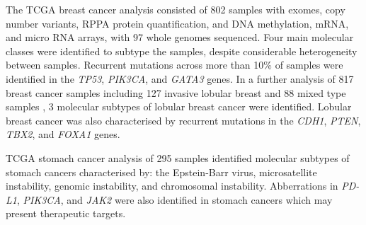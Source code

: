 The \gls{TCGA} breast cancer analysis \citep{TCGA2012} consisted of 802 samples with exomes, copy number variants, RPPA protein quantification, and \acrshort{DNA} methylation, \acrshort{mRNA}, and micro RNA arrays, with 97 whole \glspl{genome} sequenced. Four main molecular classes were identified to subtype the samples, despite considerable heterogeneity between samples. Recurrent \glspl{mutation} across more than 10\% of samples were identified in the \textit{TP53}, \textit{PIK3CA}, and \textit{GATA3} genes. %
In a further analysis of 817 breast cancer samples including 127 invasive lobular breast and 88 mixed type samples \citep{TCGA2015LBC}, 3 \glspl{molecular subtype} of lobular breast cancer were identified. Lobular breast cancer was also characterised by \glspl{recurrent mutation} in the \textit{CDH1}, \textit{PTEN}, \textit{TBX2}, and \textit{FOXA1} genes.


\gls{TCGA} stomach cancer analysis of 295 samples \citep{TCGA2014GC} identified \glspl{molecular subtype} of stomach cancers characterised by: the Epstein-Barr virus, microsatellite instability, genomic instability, and chromosomal instability. Abberrations in  \textit{PD-L1}, \textit{PIK3CA}, and \textit{JAK2} were also identified in stomach cancers which may present therapeutic targets.


